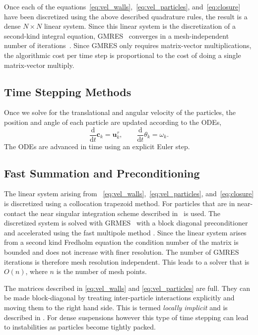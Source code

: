 \documentclass[preprint, 10pt]{elsarticle}
\begin{document}
Once each of the
equations~\eqref{eq:vel_walls},~\eqref{eq:vel_particles},
and~\eqref{eq:closure} have been discretized using the above described
quadrature rules, the result is a dense $N \times N$ linear system.
Since this linear system is the discretization of a second-kind integral
equation, GMRES~\cite{Saad1986} converges in a mesh-independent number of
iterations~\cite{cam-ips-kel-mey-xue1996}.  Since GMRES only requires
matrix-vector multiplications, the algorithmic cost per time step is
proportional to the cost of doing a single matrix-vector multiply.


\subsection{Time Stepping Methods}

Once we solve for the translational and angular velocity of the
particles, the position and angle of each particle are updated according
to the ODEs,
\[ \frac{\text{d}}{\text{d}t}\mathbf{c}_k = \mathbf{u}^\tau_k, \qquad
\frac{\text{d}}{\text{d}t}\theta_k =\omega_k.\]
The ODEs are advanced in time using an explicit Euler step. 


\subsection{Fast Summation and Preconditioning}
The linear system arising from ~\eqref{eq:vel_walls},~\eqref{eq:vel_particles},
and~\eqref{eq:closure}  is discretized using a collocation trapezoid
method. For particles that are in near-contact the near singular
integration scheme described in~\cite{Quaife2014, Ying2006} is used. The
discretized system is solved with GRMES~\cite{Saad1986} with a block
diagonal preconditioner and accelerated using the fast multipole method
\cite{Greengard1987}.  Since the linear system arises from a second kind
Fredholm equation the condition number of the matrix is bounded and does
not increase with finer resolution. The number of GMRES iterations is
therefore mesh resolution independent. This leads to a solver that is
$O(n)$, where $n$ is the number of mesh points. 

The matrices described in \eqref{eq:vel_walls} and
\eqref{eq:vel_particles} are full. They can be made block-diagonal by
treating inter-particle interactions explicitly and moving them to the
right hand side. This is termed {\em locally implicit} and is described
in \cite{Lu2017}. For dense suspensions however this type of time
stepping can lead to instabilities as particles become tightly packed. 
\end{document}

